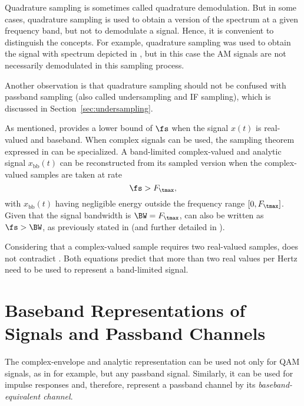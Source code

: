 Quadrature sampling is sometimes called quadrature demodulation. But in some cases, quadrature sampling is used to obtain a version of the spectrum at a given frequency band, but not to demodulate a signal.  Hence, it is convenient to distinguish the concepts. For example, quadrature sampling was used to obtain the signal with spectrum depicted in , but in this case the AM signals are not necessarily demodulated in this sampling process. %

Another observation is that quadrature sampling should not be confused with passband sampling (also called undersampling and IF sampling), which is discussed in Section~\ref{sec:undersampling}.

As mentioned,  provides a lower bound of $\fs$ when the signal $x(t)$ is real-valued and baseband.
When complex signals can be used, the sampling theorem expressed in   can be specialized. A band-limited complex-valued and analytic signal $x_{\textrm{bb}}(t)$ can be reconstructed from its sampled version when the complex-valued samples are taken at rate
\begin{equation}
\label{eq:samplingTheoremComplexSignalsRepeated}
\fs > F_\tmax,
\end{equation}
with $x_{\textrm{bb}}(t)$ having negligible energy outside the frequency range $[0, F_\tmax]$. Given that the signal bandwidth is $\BW=F_\tmax$,  can also be written as $\fs > \BW$, as previously stated in  (and
further detailed in ).

Considering that a complex-valued sample requires two real-valued samples,  does not contradict . Both equations predict that more than two real values per Hertz need to be used to represent a band-limited signal.

\section{Baseband Representations of Signals and Passband Channels}
\label{sec:basebandRepresentations}

The complex-envelope and analytic representation can be used not only for QAM signals, as in   for example, but any passband signal. Similarly, it can be used for impulse responses and, therefore, represent a passband channel by its \emph{baseband-equivalent channel}.

